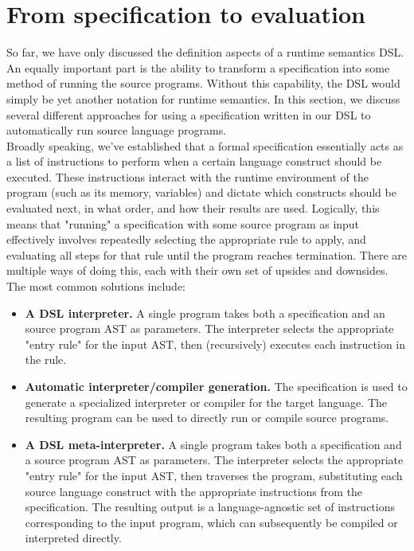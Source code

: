 \section{From specification to evaluation}
So far, we have only discussed the definition aspects of a runtime semantics \ac{DSL}. An equally important part is the ability to transform a specification into some method of running the source programs. Without this capability, the \ac{DSL} would simply be yet another notation for runtime semantics. In this section, we discuss several different approaches for using a specification written in our \ac{DSL} to automatically run source language programs. \\

Broadly speaking, we've established that a formal specification essentially acts as a list of instructions to perform when a certain language construct should be executed. These instructions interact with the runtime environment of the program (such as its memory, variables) and dictate which constructs should be evaluated next, in what order, and how their results are used. Logically, this means that "running" a specification with some source program as input effectively involves repeatedly selecting the appropriate rule to apply, and evaluating all steps for that rule until the program reaches termination. There are multiple ways of doing this, each with their own set of upsides and downsides. The most common solutions include:

\begin{itemize}
  \item \textbf{A \ac{DSL} interpreter.} A single program takes both a specification and an source program AST as parameters. The interpreter selects the appropriate "entry rule" for the input AST, then (recursively) executes each instruction in the rule.
  \item \textbf{Automatic interpreter/compiler generation.} The specification is used to generate a specialized interpreter or compiler for the target language. The resulting program can be used to directly run or compile source programs.
  \item \textbf{A \ac{DSL} meta-interpreter.}  A single program takes both a specification and a source program AST as parameters. The interpreter selects the appropriate "entry rule" for the input AST, then traverses the program, substituting each source language construct with the appropriate instructions from the specification. The resulting output is a language-agnostic set of instructions corresponding to the input program, which can subsequently be compiled or interpreted directly.
\end{itemize}

